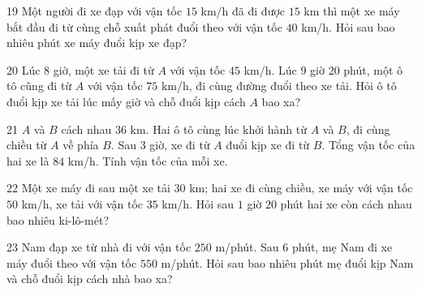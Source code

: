 \gap
\begin{probbox}{19}{\relax}
Một người đi xe đạp với vận tốc $15$ km/h đã đi được $15$ km thì một xe máy bắt đầu đi từ cùng chỗ xuất phát đuổi theo với vận tốc $40$ km/h. Hỏi sau bao nhiêu phút xe máy đuổi kịp xe đạp?
\end{probbox}
\gap
\begin{probbox}{20}{\relax}
Lúc 8 giờ, một xe tải đi từ $A$ với vận tốc $45$ km/h. Lúc 9 giờ 20 phút, một ô tô cũng đi từ $A$ với vận tốc $75$ km/h, đi cùng đường đuổi theo xe tải. Hỏi ô tô đuổi kịp xe tải lúc mấy giờ và chỗ đuổi kịp cách $A$ bao xa?
\end{probbox}
\gap
\begin{probbox}{21}{\relax}
$A$ và $B$ cách nhau $36$ km. Hai ô tô cùng lúc khởi hành từ $A$ và $B$, đi cùng chiều từ $A$ về phía $B$. Sau $3$ giờ, xe đi từ $A$ đuổi kịp xe đi từ $B$. Tổng vận tốc của hai xe là $84$ km/h. Tính vận tốc của mỗi xe.
\end{probbox}
\gap
\begin{probbox}{22}{\relax}
Một xe máy đi sau một xe tải $30$ km; hai xe đi cùng chiều, xe máy với vận tốc $50$ km/h, xe tải với vận tốc $35$ km/h. Hỏi sau $1$ giờ $20$ phút hai xe còn cách nhau bao nhiêu ki-lô-mét?
\end{probbox}
\gap
\begin{probbox}{23}{\relax}
Nam đạp xe từ nhà đi với vận tốc $250$ m/phút. Sau $6$ phút, mẹ Nam đi xe máy đuổi theo với vận tốc $550$ m/phút. Hỏi sau bao nhiêu phút mẹ đuổi kịp Nam và chỗ đuổi kịp cách nhà bao xa?
\end{probbox}

